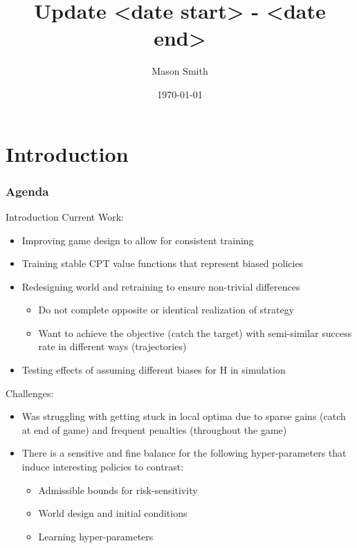 \documentclass[aspectratio=1610, xcolor=dvipsnames]{packages/beamer}
\title{Update <date start> - <date end>}\author{Mason Smith}\date\today
\newcommand{\displayTOC}{\begin{frame}\frametitle{Agenda} \tableofcontents[currentsection, subsectionstyle=show/show/hide]\end{frame}}
\begin{document}
\begin{frame}[plain]\titlepage\end{frame}


\begin{acronym}
\end{acronym}




\section{Introduction} \displayTOC

\begin{frame}{Introduction}
    Current Work: \begin{itemize}
        \item Improving game design to allow for consistent training
        \item Training stable CPT value functions that represent biased policies
        \item Redesigning world and retraining to ensure non-trivial differences
        \begin{itemize}
            \item Do not complete opposite or identical realization of strategy
            \item Want to achieve the objective (catch the target) with semi-similar success rate in different ways (trajectories)
        \end{itemize}
        \item Testing effects of assuming different biases for H in simulation
    \end{itemize}
    Challenges: \begin{itemize}
        \item Was struggling with getting stuck in local optima due to sparse gains (catch at end of game) and frequent penalties (throughout the game)

        \item There is a sensitive and fine balance for the following hyper-parameters that induce interesting policies to contrast:
        \begin{itemize}
            \item Admissible bounds for risk-sensitivity
            \item World design and initial conditions
            \item Learning hyper-parameters
        \end{itemize}
    \end{itemize}

\end{frame}
\end{document}
